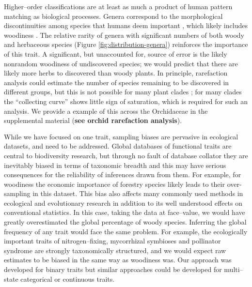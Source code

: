 \documentclass[a4paper,12pt]{article}
\begin{document}
Higher--order classifications are at least as much a product of human
pattern matching as biological processes.  Genera correspond to the
morphological discontinuities among species that humans deem important
\citep{scotland2004significance}, which likely includes woodiness
\citep[e.g.,][]{Hutchinson}.  The relative rarity of genera with
significant numbers of both woody and herbaceous species (Figure
\ref{fig:distribution-genera}) reinforces the importance of this
trait.  A significant, but unaccounted for, source of error is the likely
nonrandom woodiness of undiscovered species; we would predict that
there are likely more herbs to discovered than woody plants.  In principle,
rarefaction analysis could estimate the number of species remaining to
be discovered in different groups, but this is not possible for many
plant clades \citep{costello2011}; for many clades the ``collecting curve'' 
shows little sign of saturation, which is required for such an analysis.
We provide a example of this across the Orchidaceae in the supplemental material
(\textbf{see orchid rarefaction analysis}).

While we have focused on one trait, sampling biases are pervasive in ecological datasets, and need to be addressed.
Global databases of functional traits
\citep[e.g., TRY;][]{kattge2011try} are central to biodiversity
research, but through no fault of database collator they are inevitably biased in terms of taxonomic breadth
and this may have serious consequences for the reliability of
inferences drawn from them.
For example, for woodiness the economic importance of forestry species
likely leads to their
over-sampling in this dataset.
This bias also affects many commonly used methods in ecological and evolutionary research \citep[e.g.,][]{ackerly2000taxon,nakagawa2008missing,pennell2013integrative, Pakeman2013} in addition to its well understood effects on conventional statistics.  In this case, taking the data at face--value, 
we would have greatly overestimated
the global percentage of woody species.  Inferring the global
frequency of any trait would face the same problem.  For
example, the ecologically important traits of nitrogen--fixing,
mycorrhizal symbioses and pollinator syndrome are strongly
taxonomically structured, and we would expect raw estimates to be
biased in the same way as woodiness was.  Our approach was developed
for binary traits
but similar approaches could be developed for multi--state categorical or continuous traits.
\end{document}
